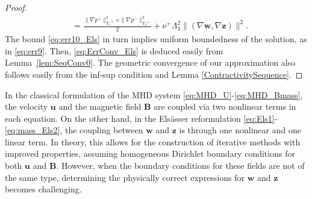 \documentclass[3p]{elsarticle}
\def\nuplus{\nu^{+}}
\def\pplus{p^{+}}
\def\pminus{p^{-}}
\def\V#1{\mathbf{#1}}
\newcommand{\Luinvmap}{\mathrm{T_1^{-1}}}
\newcommand{\Lbinvmap}{\mathrm{T_2^{-1}}}
\begin{document}
\begin{proof}
\begin{equation}
\begin{aligned}
& = \frac{ \|\nabla \pplus \|^2_{\Luinvmap} +  \|\nabla \pminus \|^2_{\Lbinvmap}}{2} + \nuplus \Lambda_3^2 \| (\nabla \V{w},\nabla \V{z}) \|^2.
\end{aligned}
\end{equation}
The bound \eqref{eq:err10_Els} in turn implies uniform boundedness of the solution, as in \eqref{eq:err9}. Then, \eqref{eq:ErrConv_Els} is deduced easily from Lemma~\ref{lem:SeqConv0}. The geometric convergence of our approximation also follows easily from the inf-sup condition and Lemma \ref{ContractivitySequence}.
\end{proof}
\begin{remark}
In the classical formulation of the MHD system \eqref{eq:MHD_U}-\eqref{eq:MHD_Bmass}, the velocity $\V{u}$ and the magnetic field $\V{B}$ are coupled via two nonlinear terms in each equation. On the other hand, in the Els{\"a}sser reformulation \eqref{eq:Els1}-\eqref{eq:mass_Els2}, the coupling between $\V{w}$ and $\V{z}$ is through one nonlinear and one linear term. In theory, this allows for the construction of iterative methods with improved properties, assuming homogeneous Dirichlet boundary conditions for both $\V{u}$ and $\V{B}$. However, when the boundary conditions for these fields are not of the same type, determining the physically correct expressions for $\V{w}$ and $\V{z}$ becomes challenging.   
\end{remark}
\end{document}

